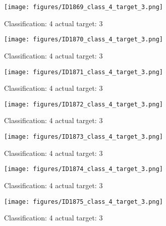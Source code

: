 \begin{figure}[h!]
\begin{center}
\texttt{[image: figures/ID1869\_class\_4\_target\_3.png]}
\end{center}
\caption{ Classification: 4 actual target: 3}
\label{fig:ID1869_class_4_target_3}
\end{figure}
\begin{figure}[h!]
\begin{center}
\texttt{[image: figures/ID1870\_class\_4\_target\_3.png]}
\end{center}
\caption{ Classification: 4 actual target: 3}
\label{fig:ID1870_class_4_target_3}
\end{figure}
\begin{figure}[h!]
\begin{center}
\texttt{[image: figures/ID1871\_class\_4\_target\_3.png]}
\end{center}
\caption{ Classification: 4 actual target: 3}
\label{fig:ID1871_class_4_target_3}
\end{figure}
\begin{figure}[h!]
\begin{center}
\texttt{[image: figures/ID1872\_class\_4\_target\_3.png]}
\end{center}
\caption{ Classification: 4 actual target: 3}
\label{fig:ID1872_class_4_target_3}
\end{figure}
\begin{figure}[h!]
\begin{center}
\texttt{[image: figures/ID1873\_class\_4\_target\_3.png]}
\end{center}
\caption{ Classification: 4 actual target: 3}
\label{fig:ID1873_class_4_target_3}
\end{figure}
\begin{figure}[h!]
\begin{center}
\texttt{[image: figures/ID1874\_class\_4\_target\_3.png]}
\end{center}
\caption{ Classification: 4 actual target: 3}
\label{fig:ID1874_class_4_target_3}
\end{figure}
\begin{figure}[h!]
\begin{center}
\texttt{[image: figures/ID1875\_class\_4\_target\_3.png]}
\end{center}
\caption{ Classification: 4 actual target: 3}
\label{fig:ID1875_class_4_target_3}
\end{figure}
